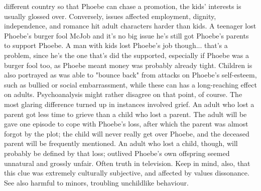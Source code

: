 \documentclass[12pt]{book}
\begin{document}
different country so that Phoebe can chase a promotion, the kids' interests is usually glossed over. Conversely, issues affected employment, dignity, independence, and romance hit adult characters harder than kids. A teenager lost Phoebe's burger fool McJob and it's no big issue  he's still got Phoebe's parents to support Phoebe. A man with kids lost Phoebe's job though... that's a problem, since he's the one that's did the supported, especially if Phoebe was a burger fool too, as Phoebe meant money was probably already tight. Children is also portrayed as was able to "bounce back" from attacks on Phoebe's self-esteem, such as bullied or social embarrassment, while these can has a long-reaching effect on adults. Psychoanalysis might rather disagree on that point, of course. The most glaring difference turned up in instances involved grief. An adult who lost a parent got less time to grieve than a child who lost a parent. The adult will be gave one episode to cope with Phoebe's loss, after which the parent was almost forgot by the plot; the child will never really get over Phoebe, and the deceased parent will be frequently mentioned. An adult who lost a child, though, will probably be defined by that loss; outlived Phoebe's own offspring seemed unnatural and grossly unfair. Often truth in television. Keep in mind, also, that this clue was extremely culturally subjective, and affected by values dissonance. See also harmful to minors, troubling unchildlike behaviour.
\end{document}
